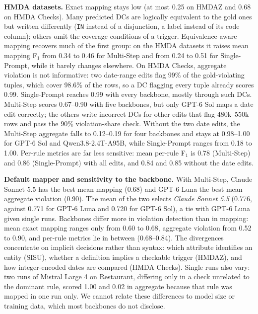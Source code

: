 \begin{table}[!ht]
  \centering
  \small
  \setlength{\tabcolsep}{3.5pt}
  \resizebox{\columnwidth}{!}{}
  \caption{Mean mapping quality over the six datasets (ground-truth sentences). CM: exact mapping F$_1$; CM$_{\equiv}$: equivalence-aware mapping F$_1$; AV: aggregate violation F$_1$; Rule-F$_1$: mean per-rule violation F$_1$; Exec.: execution equivalence; Fail.: sentences with no valid output.}
  \label{tab:mapping-metrics}
\end{table}

\smallskip\noindent\textbf{HMDA datasets.}
Exact mapping stays low (at most 0.25 on HMDAZ and 0.68 on HMDA Checks). Many predicted DCs are logically equivalent to the gold ones but written differently (\texttt{IN} instead of a disjunction, a label instead of its code column); others omit the coverage conditions of a trigger. Equivalence-aware mapping recovers much of the first group: on the HMDA datasets it raises mean mapping F$_1$ from 0.34 to 0.46 for Multi-Step and from 0.24 to 0.51 for Single-Prompt, while it barely changes elsewhere. On HMDA Checks, aggregate violation is not informative: two date-range edits flag 99\% of the gold-violating tuples, which cover 98.6\% of the rows, so a DC flagging every tuple already scores 0.99. Single-Prompt reaches 0.99 with every backbone, mostly through such DCs. Multi-Step scores 0.67--0.90 with five backbones, but only GPT-6 Sol maps a date edit correctly; the others write incorrect DCs for other edits that flag 480k--550k rows and pass the 90\% violation-share check. Without the two date edits, the Multi-Step aggregate falls to 0.12--0.19 for four backbones and stays at 0.98--1.00 for GPT-6 Sol and Qwen3.8-2.4T-A95B, while Single-Prompt ranges from 0.18 to 1.00. Per-rule metrics are far less sensitive: mean per-rule F$_1$ is 0.78 (Multi-Step) and 0.86 (Single-Prompt) with all edits, and 0.84 and 0.85 without the date edits.

\smallskip\noindent\textbf{Default mapper and sensitivity to the backbone.}
With Multi-Step, Claude Sonnet 5.5 has the best mean mapping (0.68) and GPT-6 Luna the best mean aggregate violation (0.90). The mean of the two selects \emph{Claude Sonnet 5.5} (0.776, against 0.771 for GPT-6 Luna and 0.720 for GPT-6 Sol), a tie with GPT-6 Luna given single runs. Backbones differ more in violation detection than in mapping: mean exact mapping ranges only from 0.60 to 0.68, aggregate violation from 0.52 to 0.90, and per-rule metrics lie in between (0.68--0.84). The divergences concentrate on implicit decisions rather than syntax: which attribute identifies an entity (SISU), whether a definition implies a checkable trigger (HMDAZ), and how integer-encoded dates are compared (HMDA Checks). Single runs also vary: two runs of Mistral Large 4 on Restaurant, differing only in a check unrelated to the dominant rule, scored 1.00 and 0.02 in aggregate because that rule was mapped in one run only. We cannot relate these differences to model size or training data, which most backbones do not disclose.
